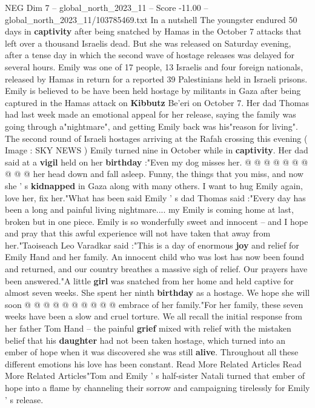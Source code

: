 \begin{textsample}{NEG Dim 7 – global\_north\_2023\_11 – Score -11.00 – global\_north\_2023\_11/103785469.txt}  \label{ex:f7_neg_044}
In a nutshell The youngster endured 50 days in \textbf{captivity} after being snatched by Hamas in the October 7 attacks that left over a thousand Israelis dead.
But she was released on Saturday evening, after a tense day in which the second wave of hostage releases was delayed for several hours.
Emily was one of 17 people, 13 Israelis and four foreign nationals, released by Hamas in return for a reported 39 Palestinians held in Israeli prisons.
Emily is believed to be have been held hostage by militants in Gaza after being captured in the Hamas attack on \textbf{Kibbutz} Be'eri on October 7.
Her dad Thomas had last week made an emotional appeal for her release, saying the family was going through a"nightmare", and getting Emily back was his"reason for living".
The second round of Israeli hostages arriving at the Rafah crossing this evening ( Image : SKY NEWS ) Emily turned nine in October while in \textbf{captivity}.
Her dad said at a \textbf{vigil} held on her \textbf{birthday} :"Even my dog misses her. @ @ @ @ @ @ @ @ @ @ her head down and fall asleep.
Funny, the things that you miss, and now she ' s \textbf{kidnapped} in Gaza along with many others.
I want to hug Emily again, love her, fix her."What has been said Emily ' s dad Thomas said :"Every day has been a long and painful living nightmare.... my Emily is coming home at last, broken but in one piece.
Emily is so wonderfully sweet and innocent -- and I hope and pray that this awful experience will not have taken that away from her."Taoiseach Leo Varadkar said :"This is a day of enormous \textbf{joy} and relief for Emily Hand and her family.
An innocent child who was lost has now been found and returned, and our country breathes a massive sigh of relief.
Our prayers have been answered."A little \textbf{girl} was snatched from her home and held captive for almost seven weeks.
She spent her ninth \textbf{birthday} as a hostage.
We hope she will soon @ @ @ @ @ @ @ @ @ @ embrace of her family."For her family, these seven weeks have been a slow and cruel torture.
We all recall the initial response from her father Tom Hand -- the painful \textbf{grief} mixed with relief with the mistaken belief that his \textbf{daughter} had not been taken hostage, which turned into an ember of hope when it was discovered she was still \textbf{alive}.
Throughout all these different emotions his love has been constant.
Read More Related Articles Read More Related Articles"Tom and Emily ' s half-sister Natali turned that ember of hope into a flame by channeling their sorrow and campaigning tirelessly for Emily ' s release.

\end{textsample}

